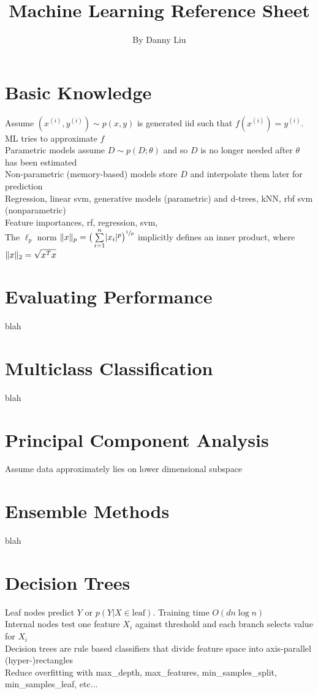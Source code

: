 \documentclass{article}
\title{Machine Learning Reference Sheet}
\author{By Danny Liu}
\date{}
\DeclarePairedDelimiter\abs{\lvert}{\rvert}
\DeclarePairedDelimiter\norm{\lVert}{\rVert}
\begin{document}
\maketitle

\section{Basic Knowledge}
Assume $(x^{(i)}, y^{(i)}) \sim p(x,y)$ is generated iid such that $f(x^{(i)}) = y^{(i)}$. ML tries to approximate $f$ \\
Parametric models assume $D \sim p(D; \theta)$ and so $D$ is no longer needed after $\theta$ has been estimated \\
Non-parametric (memory-based) models store $D$ and interpolate them later for prediction \\
Regression, linear svm, generative models (parametric) and d-trees, kNN, rbf svm (nonparametric) \\
Feature importances, rf, regression, svm, \\
The $\ell_p$ norm $\norm{x}_p = \big(\sum\limits_{i=1}^n \abs{x_i}^p \big)^{\sfrac{1}{p}}$ implicitly defines an inner product, where $\norm{x}_2 =  \sqrt{x^Tx}$ 

\section{Evaluating Performance}
blah

\section{Multiclass Classification}
blah

\section{Principal Component Analysis}
Assume data approximately lies on lower dimensional subspace

\section{Ensemble Methods}
blah

\section{Decision Trees}
Leaf nodes predict $Y$ or $p(Y|X \in \mbox{leaf})$. Training time $O(dn\log n)$ \\ 
Internal nodes test one feature $X_i$ against threshold and each branch selects value for $X_i$ \\
Decision trees are rule based classifiers that divide feature space into axis-parallel (hyper-)rectangles \\
Reduce overfitting with max\_depth, max\_features, min\_samples\_split, min\_samples\_leaf, etc...
\end{document}
